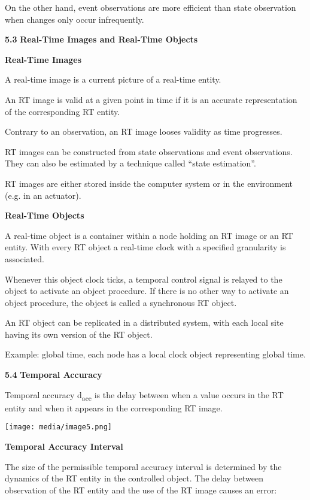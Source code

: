 On the other hand, event observations are more efficient than state
observation when changes only occur infrequently.

\textbf{5.3} \protect\hypertarget{teil4}{}{}\textbf{Real-Time Images and
Real-Time Objects }

\textbf{Real-Time Images}

A real-time image is a current picture of a real-time entity.

An RT image is valid at a given point in time if it is an accurate
representation of the corresponding RT entity.

Contrary to an observation, an RT image looses validity as time
progresses.

RT images can be constructed from state observations and event
observations. They can also be estimated by a technique called ``state
estimation''.

RT images are either stored inside the computer system or in the
environment (e.g. in an actuator).

\textbf{Real-Time Objects}

A real-time object is a container within a node holding an RT image or
an RT entity. With every RT object a real-time clock with a specified
granularity is associated.

Whenever this object clock ticks, a temporal control signal is relayed
to the object to activate an object procedure. If there is no other way
to activate an object procedure, the object is called a synchronous RT
object.

An RT object can be replicated in a distributed system, with each local
site having its own version of the RT object.

Example: global time, each node has a local clock object representing
global time.

\textbf{5.4} \protect\hypertarget{teil5}{}{}\textbf{Temporal Accuracy}

Temporal accuracy d\textsubscript{acc} is the delay between when a value
occurs in the RT entity and when it appears in the corresponding RT
image.

\texttt{[image: media/image5.png]}

\textbf{Temporal Accuracy Interval}

The size of the permissible temporal accuracy interval is determined by
the dynamics of the RT entity in the controlled object. The delay
between observation of the RT entity and the use of the RT image causes
an error:


